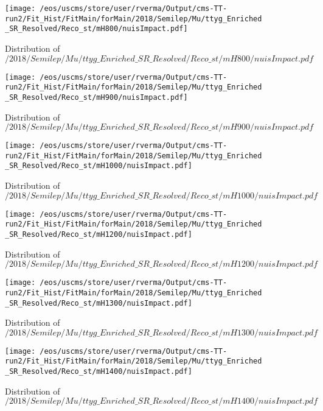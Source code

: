 \begin{figure}
\centering
\texttt{[image: /eos/uscms/store/user/rverma/Output/cms-TT-run2/Fit\_Hist/FitMain/forMain/2018/Semilep/Mu/ttyg\_Enriched\_SR\_Resolved/Reco\_st/mH800/nuisImpact.pdf]}
\caption{Distribution of $/2018/Semilep/Mu/ttyg\_Enriched\_SR\_Resolved/Reco\_st/mH800/nuisImpact.pdf$}
\end{figure}

\begin{figure}
\centering
\texttt{[image: /eos/uscms/store/user/rverma/Output/cms-TT-run2/Fit\_Hist/FitMain/forMain/2018/Semilep/Mu/ttyg\_Enriched\_SR\_Resolved/Reco\_st/mH900/nuisImpact.pdf]}
\caption{Distribution of $/2018/Semilep/Mu/ttyg\_Enriched\_SR\_Resolved/Reco\_st/mH900/nuisImpact.pdf$}
\end{figure}

\begin{figure}
\centering
\texttt{[image: /eos/uscms/store/user/rverma/Output/cms-TT-run2/Fit\_Hist/FitMain/forMain/2018/Semilep/Mu/ttyg\_Enriched\_SR\_Resolved/Reco\_st/mH1000/nuisImpact.pdf]}
\caption{Distribution of $/2018/Semilep/Mu/ttyg\_Enriched\_SR\_Resolved/Reco\_st/mH1000/nuisImpact.pdf$}
\end{figure}

\begin{figure}
\centering
\texttt{[image: /eos/uscms/store/user/rverma/Output/cms-TT-run2/Fit\_Hist/FitMain/forMain/2018/Semilep/Mu/ttyg\_Enriched\_SR\_Resolved/Reco\_st/mH1200/nuisImpact.pdf]}
\caption{Distribution of $/2018/Semilep/Mu/ttyg\_Enriched\_SR\_Resolved/Reco\_st/mH1200/nuisImpact.pdf$}
\end{figure}

\begin{figure}
\centering
\texttt{[image: /eos/uscms/store/user/rverma/Output/cms-TT-run2/Fit\_Hist/FitMain/forMain/2018/Semilep/Mu/ttyg\_Enriched\_SR\_Resolved/Reco\_st/mH1300/nuisImpact.pdf]}
\caption{Distribution of $/2018/Semilep/Mu/ttyg\_Enriched\_SR\_Resolved/Reco\_st/mH1300/nuisImpact.pdf$}
\end{figure}

\begin{figure}
\centering
\texttt{[image: /eos/uscms/store/user/rverma/Output/cms-TT-run2/Fit\_Hist/FitMain/forMain/2018/Semilep/Mu/ttyg\_Enriched\_SR\_Resolved/Reco\_st/mH1400/nuisImpact.pdf]}
\caption{Distribution of $/2018/Semilep/Mu/ttyg\_Enriched\_SR\_Resolved/Reco\_st/mH1400/nuisImpact.pdf$}
\end{figure}

